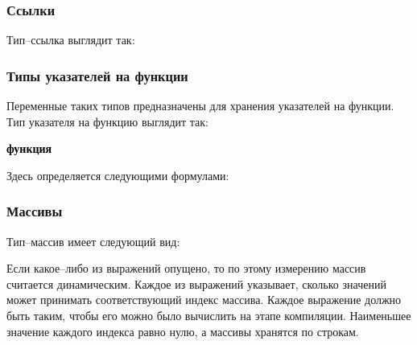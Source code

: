 \documentclass[10pt]{report}
\begin{document}
        \subsubsection{Ссылки}
Тип--ссылка выглядит так:        
\begin{center}
\noindent\textcolor{Green}{}
\end{center}
        
        \subsubsection{Типы указателей на функции}

Переменные таких типов предназначены для хранения указателей на функции. Тип указателя на функцию выглядит так:
\begin{center}
\noindent\textcolor{Green}{\textcolor{Black}{\textbf{функция}}  }
\end{center}

Здесь \textcolor{Green}{} определяется следующими формулами:

\textcolor{Green}{}

        \subsubsection{Массивы}
Тип--массив имеет следующий вид:
\begin{center}
\noindent\textcolor{Green}{}
\end{center}


Если какое--либо из выражений опущено, то по этому измерению массив считается динамическим. Каждое из выражений указывает, сколько значений может принимать соответствующий
индекс массива. Каждое выражение должно быть таким, чтобы его можно было вычислить на этапе компиляции. Наименьшее значение каждого индекса равно нулю, а массивы хранятся по
строкам.
\end{document}
